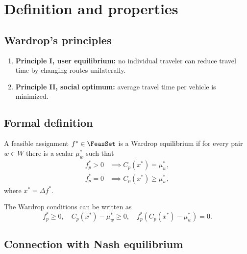 
\section{Definition and properties}

\subsection{Wardrop's principles}


\begin{definition}\label{def:wardrop_principles}
\begin{enumerate}
    \item \textbf{Principle I, user equilibrium:} no individual traveler can reduce travel time by changing routes unilaterally.
    \item \textbf{Principle II, social optimum:} average travel time per vehicle is minimized.
\end{enumerate}
\end{definition}

\subsection{Formal definition}

\begin{definition}\label{def:wardrop_equilibrium}
A feasible assignment $f^* \in \FeasSet$ is a Wardrop equilibrium if for every pair $w \in W$ there is a scalar $\mu_w^*$ such that
\begin{align}
f_p^* > 0 &\implies C_p(x^*) = \mu_w^*, \label{eq:wardrop_used}\\
f_p^* = 0 &\implies C_p(x^*) \geq \mu_w^*, \label{eq:wardrop_unused}
\end{align}
where $x^* = \Delta f^*$.
\end{definition}

\begin{definition}
The Wardrop conditions can be written as
\[
f_p^* \geq 0,\quad C_p(x^*)-\mu_w^* \geq 0,\quad
f_p^*\left(C_p(x^*)-\mu_w^*\right)=0.
\]
\end{definition}

\subsection{Connection with Nash equilibrium}

